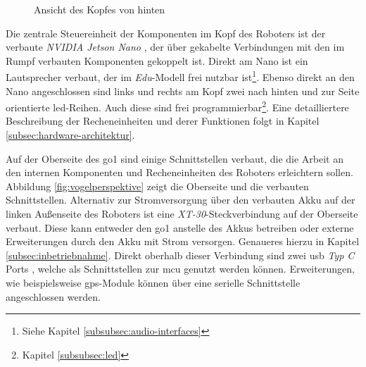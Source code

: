 \begin{figure}[h]
    \caption{Ansicht des Kopfes von hinten}\label{fig:kopf}
\end{figure}

Die zentrale Steuereinheit der Komponenten im Kopf des Roboters ist der verbaute \emph{NVIDIA Jetson Nano} , der
über gekabelte Verbindungen  mit den im Rumpf verbauten Komponenten gekoppelt ist.
Direkt am Nano ist ein Lautsprecher  verbaut, der im \emph{Edu}-Modell frei nutzbar ist\footnote{Siehe Kapitel \ref{subsubsec:audio-interfaces}}.
Ebenso direkt an den Nano angeschlossen sind links und rechts am Kopf zwei nach hinten und zur Seite orientierte
\gls{led}-Reihen.
Auch diese sind frei programmierbar\footnote{Kapitel \ref{subsubsec:led}}.
Eine detailliertere Beschreibung der Recheneinheiten und derer Funktionen folgt in Kapitel \ref{subsec:hardware-architektur}.

Auf der Oberseite des \gls{go1} sind einige Schnittstellen verbaut, die die Arbeit an den internen Komponenten und
Recheneinheiten des Roboters erleichtern sollen.
Abbildung \ref{fig:vogelperspektive} zeigt die Oberseite und die verbauten Schnittstellen.
Alternativ zur Stromversorgung über den verbauten Akku  auf der linken Außenseite des Roboters ist eine
\emph{XT-30}-Steckverbindung  auf der Oberseite verbaut.
Diese kann entweder den \gls{go1} anstelle des Akkus betreiben oder externe Erweiterungen durch den Akku mit Strom versorgen.
Genaueres hierzu in Kapitel \ref{subsec:inbetriebnahme}.
Direkt oberhalb dieser Verbindung sind zwei \gls{usb} \emph{Typ C} Ports , welche als Schnittstellen zur \gls{mcu} genutzt werden können.
Erweiterungen, wie beispielsweise \gls{gps}-Module können über eine serielle Schnittstelle  angeschlossen werden.

